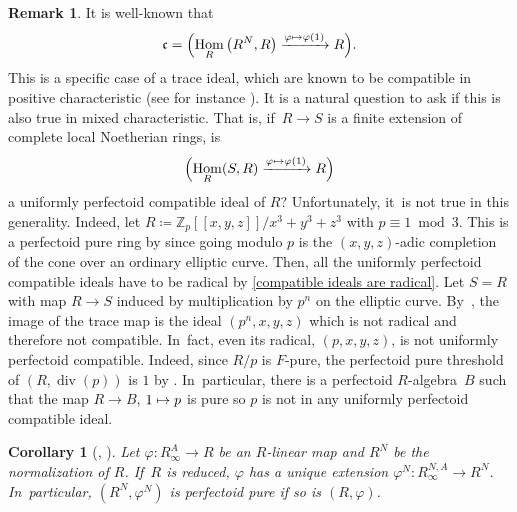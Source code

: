 \documentclass[JEP,XML,SOM,Unicode,published]{cedram}
\let\autoref\cref
\newcommand\mto{\mathchoice{\longmapsto}{\mapsto}{\mapsto}{\mapsto}}
\theoremstyle{plain}
\newtheorem{corollary}[theorem]{Corollary}
\theoremstyle{definition}
\newtheorem{remark}[theorem]{Remark}
\numberwithin{equation}{theorem}
\newcommand{\Z}{\mathbb {Z}}
\newcommand{\fracc}{\mathfrak{c}}
\DeclareMathOperator{\Div}{{div}}
\DeclareMathOperator{\Hom}{Hom}
\let\Im\relax
\DeclareMathOperator{\Im}{Im}
\newcommand{\llbracket}{[\![}
\newcommand{\rrbracket}{]\!]}
\renewcommand{\phi}{\varphi}
\newcommand{\rafty}{R^A_\infty}
\newcommand{\ranfty}{R^{N,A}_\infty}
\begin{document}
\begin{remark}
It is well-known that
\[\fracc=\Im\Bigl(\Hom_R\left(R^N,R\right)\xrightarrow{\phi\mto \phi(1)} R\Bigr).\]
This is a specific case of a trace ideal, which are known to be compatible in positive characteristic (see for instance \cite[Lem.\,2.2]{PolstraSchwedeCompatibleIdealsGorensteinRings}). It is a natural question to ask if this is also true in mixed characteristic. That is, if~$R\to S$ is a finite extension of complete local Noetherian rings, is
\[\Im\Bigl(\Hom_R(S,R)\xrightarrow{\phi\mto \phi(1)} R\Bigr)\] a uniformly perfectoid compatible ideal of $R$? Unfortunately, it~is not true in this generality. Indeed, let $R\coloneqq \Z_p\llbracket x,y,z\rrbracket/x^3+y^3+z^3$ with $p\equiv 1 \bmod 3$. This is a perfectoid pure ring by \cite[Ex.\,7.3]{BMPSTWWPerfectoidPure} since going modulo $p$ is the $(x,y,z)$-adic completion of the cone over an ordinary elliptic curve. Then, all the uniformly perfectoid compatible ideals have to be radical by \autoref{compatible ideals are radical}. Let $S=R$ with map $R\to S$ induced by multiplication by $p^n$ on the elliptic curve. By~\cite[Ex.\,4.14]{BMPSTWWMinimalModelProgramMixedCharacteristic}, the image of the trace map is the ideal $(p^n,x,y,z)$ which is not radical and therefore not compatible. In~fact, even its radical, $(p,x,y,z)$, is not uniformly perfectoid compatible. Indeed, since $R/p$ is $F$-pure, the perfectoid pure threshold of $(R,\Div(p))$ is $1$ by \cite[Rem.\,2.10]{YoshikawaComputationMethodPerfectoidPurity}. In~particular, there is a perfectoid $R$\nobreakdash-algebra~$B$ such that the map $R\to B$, $1\mto p$ is pure so $p$ is not in any uniformly perfectoid compatible ideal.
\end{remark}

\begin{corollary}[{\cf \cite[Prop.\,7.11]{SchwedeCentersOfFPurity},
\cite[Exer.\,1.2.E\,(4)]{BrionKumarFrobeniusSplitting}}]\label{purity extends to normalization}
Let $\phi\colon \rafty\to R$ be an $R$\nobreakdash-linear map and $R^N$ be the normalization of $R$. If~$R$ is reduced, $\phi$ has a unique extension $\phi^N\colon \ranfty \to R^N$. In~particular, $(R^N,\phi^N)$ is perfectoid pure if so is $(R,\phi)$.
\end{corollary}
\end{document}
